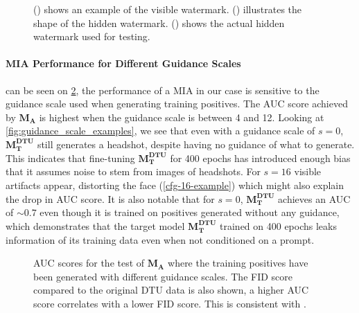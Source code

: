 \begin{figure}[h!t]
\centering
{}
\hfill
{}%
\hfill
{}%
\caption{(\protect{}) shows an example of the visible watermark. (\protect{}) illustrates the shape of the hidden watermark. (\protect{}) shows the actual hidden watermark used for testing.}
\label{fig:watermark_examples}
\end{figure}

\paragraph{MIA Performance for Different Guidance Scales} can be seen on \cref{fig:guidance_auc}, the performance of a MIA in our case is sensitive to the guidance scale used when generating training positives. The AUC score achieved by $\mathbf{M_A}$ is highest when the guidance scale is between 4 and 12. Looking at \cref{fig:guidance_scale_examples}, we see that even with a guidance scale of $s=0$, $\mathbf{M_T^{DTU}}$ still generates a headshot, despite having no guidance of what to generate. This indicates that fine-tuning $\mathbf{M_T^{DTU}}$ for 400 epochs has introduced enough bias that it assumes noise to stem from images of headshots. For $s=16$ visible artifacts appear, distorting the face (\cref{cfg-16-example}) which might also explain the drop in AUC score. It is also notable that for $s=0$, $\mathbf{M_T^{DTU}}$ achieves an AUC of $\sim0.7$ even though it is trained on positives generated without any guidance, which demonstrates that the target model $\mathbf{M_T^{DTU}}$ trained on 400 epochs leaks information of its training data even when not conditioned on a prompt.

\begin{figure}[h!t]
    \centering
    \scalebox{0.25}{}
    \caption{AUC scores for the test of $\mathbf{M_A}$ where the training positives have been generated with different guidance scales. The FID score compared to the original DTU data is also shown, a higher AUC score correlates with a lower FID score. This is consistent with \cite{Carlini2023ExtractingTD}.}
    \label{fig:guidance_auc}
\end{figure}

